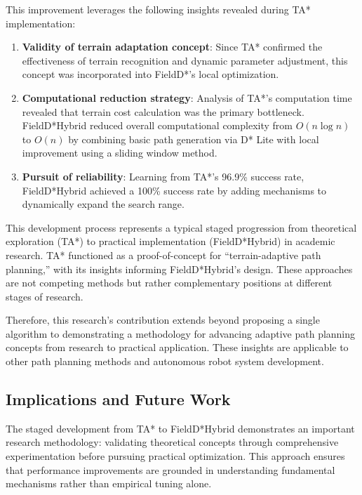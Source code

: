 This improvement leverages the following insights revealed during TA* implementation:

\begin{enumerate}
    \item \textbf{Validity of terrain adaptation concept}: Since TA* confirmed the effectiveness of terrain recognition and dynamic parameter adjustment, this concept was incorporated into FieldD*'s local optimization.
    
    \item \textbf{Computational reduction strategy}: Analysis of TA*'s computation time revealed that terrain cost calculation was the primary bottleneck. FieldD*Hybrid reduced overall computational complexity from $O(n \log n)$ to $O(n)$ by combining basic path generation via D* Lite with local improvement using a sliding window method.
    
    \item \textbf{Pursuit of reliability}: Learning from TA*'s 96.9\% success rate, FieldD*Hybrid achieved a 100\% success rate by adding mechanisms to dynamically expand the search range.
\end{enumerate}

This development process represents a typical staged progression from theoretical exploration (TA*) to practical implementation (FieldD*Hybrid) in academic research. TA* functioned as a proof-of-concept for ``terrain-adaptive path planning,'' with its insights informing FieldD*Hybrid's design. These approaches are not competing methods but rather complementary positions at different stages of research.

Therefore, this research's contribution extends beyond proposing a single algorithm to demonstrating a methodology for advancing adaptive path planning concepts from research to practical application. These insights are applicable to other path planning methods and autonomous robot system development.

\subsection{Implications and Future Work}

The staged development from TA* to FieldD*Hybrid demonstrates an important research methodology: validating theoretical concepts through comprehensive experimentation before pursuing practical optimization. This approach ensures that performance improvements are grounded in understanding fundamental mechanisms rather than empirical tuning alone.

